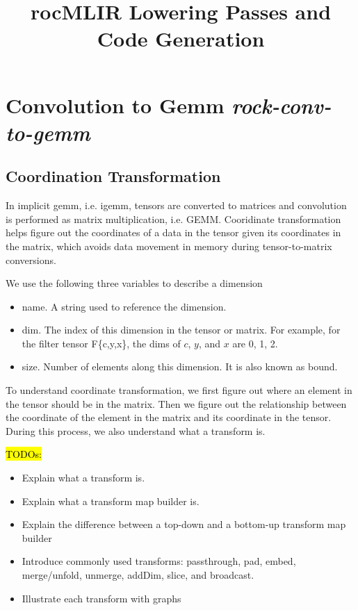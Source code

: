 


\setcounter{tocdepth}{2}


\title{rocMLIR Lowering Passes and Code Generation}

\maketitle

\tableofcontents
\newpage

\section{Convolution to Gemm \emph{rock-conv-to-gemm}}\label{sec:conv-to-gemm}

\subsection{Coordination Transformation}\label{sec:coord_transform}

In implicit gemm, i.e. igemm, tensors are converted to matrices and convolution
is performed as matrix multiplication, i.e. GEMM.
Cooridinate transformation helps figure out the coordinates of a data in the
tensor given its coordinates in the matrix, which avoids data movement in memory
during tensor-to-matrix conversions.

We use the following three variables to describe a dimension
\begin{itemize}
\item name. A string used to reference the dimension.
\item dim. The index of this dimension in the tensor or matrix.
  For example, for the filter tensor F\{c,y,x\},
  the dims of $c$, $y$, and $x$ are 0, 1, 2.
\item size. Number of elements along this dimension. It is also known as bound.
\end{itemize}

To understand coordinate transformation, we first figure out where an element
in the tensor should be in the matrix.
Then we figure out the relationship between the coordinate of the element in the
matrix and its coordinate in the tensor.
During this process, we also understand what a transform is.

\hl{TODOs:}
\begin{itemize}
\item Explain what a transform is.
\item Explain what a transform map builder is.
\item Explain the difference between a top-down and a bottom-up transform map builder
\item Introduce commonly used transforms: passthrough, pad, embed, merge/unfold, unmerge,
  addDim, slice, and broadcast.
\item Illustrate each transform with graphs
\end{itemize}



